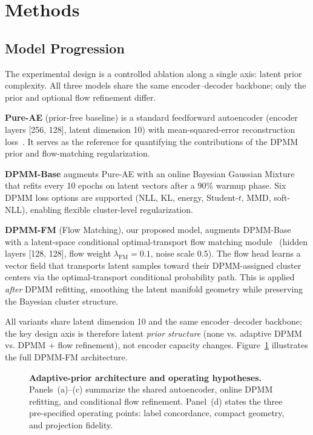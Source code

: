 \documentclass[biology,article,submit,pdftex,moreauthors]{Definitions/mdpi}
\begin{document}
\FloatBarrier
\section{Methods}\label{sec:methods}

\subsection{Model Progression}
The experimental design is a controlled ablation along a single axis: latent prior complexity. All three models share the same encoder--decoder backbone; only the prior and optional flow refinement differ.

\textbf{Pure-AE} (prior-free baseline) is a standard feedforward autoencoder (encoder layers [256, 128], latent dimension 10) with mean-squared-error reconstruction loss~\cite{kingma2014auto}. It serves as the reference for quantifying the contributions of the DPMM prior and flow-matching regularization.

\textbf{DPMM-Base} augments Pure-AE with an online Bayesian Gaussian Mixture~\cite{blei2006variational,bishop2006pattern} that refits every 10 epochs on latent vectors after a 90\% warmup phase. Six DPMM loss options are supported (NLL, KL, energy, Student-$t$, MMD, soft-NLL), enabling flexible cluster-level regularization.

\textbf{DPMM-FM} (Flow Matching), our proposed model, augments DPMM-Base with a latent-space conditional optimal-transport flow matching module~\cite{lipman2023flow,tong2024improving} (hidden layers [128, 128], flow weight $\lambda_\text{FM}{=}0.1$, noise scale 0.5). The flow head learns a vector field that transports latent samples toward their DPMM-assigned cluster centers via the optimal-transport conditional probability path. This is applied \emph{after} DPMM refitting, smoothing the latent manifold geometry while preserving the Bayesian cluster structure.

All variants share latent dimension 10 and the same encoder--decoder backbone; the key design axis is therefore latent \emph{prior structure} (none vs. adaptive DPMM vs. DPMM + flow refinement), not encoder capacity changes. Figure~\ref{fig:arch} illustrates the full DPMM-FM architecture.

\begin{figure}[H]
\centering

\caption{\textbf{Adaptive-prior architecture and operating hypotheses.} Panels~(a)--(c) summarize the shared autoencoder, online DPMM refitting, and conditional flow refinement. Panel~(d) states the three pre-specified operating points: label concordance, compact geometry, and projection fidelity.}
\label{fig:arch}
\end{figure}
\end{document}
